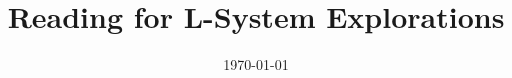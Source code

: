 \documentclass[letterpaper,11pt,reqno]{amsart}
\begin{document}
\title{Reading for L-System Explorations}
\date{\today}
\maketitle

\nocite{*}


\end{document}
